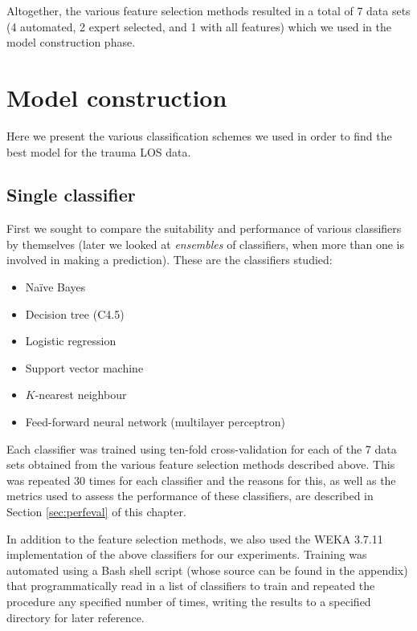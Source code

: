 Altogether, the various feature selection methods resulted in a total of
7 data sets (4 automated, 2 expert selected, and 1 with all features) which
we used in the model construction phase.

\section{Model construction}
Here we present the various classification schemes we used in order to find
the best model for the trauma LOS data.

\subsection{Single classifier}
First we sought to compare the suitability and performance of various
classifiers by themselves (later we looked at \textit{ensembles} of
classifiers, when more than one is involved in making a prediction).
These are the
classifiers studied: 
\begin{itemize}
  \item Na\"{i}ve Bayes
  \item Decision tree (C4.5)
  \item Logistic regression
  \item Support vector machine
  \item $K$-nearest neighbour
  \item Feed-forward neural network (multilayer perceptron)
\end{itemize}

Each classifier was trained using ten-fold cross-validation for each of the
7 data sets obtained from the various feature selection methods described
above. This was repeated 30 times for each classifier and the reasons for
this, as well as the metrics used to assess the performance of these
classifiers, are described in Section \ref{sec:perfeval} of this chapter.

In addition to the feature selection methods, we also used the WEKA 3.7.11
\citep{Hall2009} implementation of the above classifiers for our experiments.
Training was automated using a Bash shell script (whose source can be found
in the appendix) that programmatically read in a list of classifiers to
train and repeated the procedure any specified number of times, writing the
results to a specified directory for later reference.

